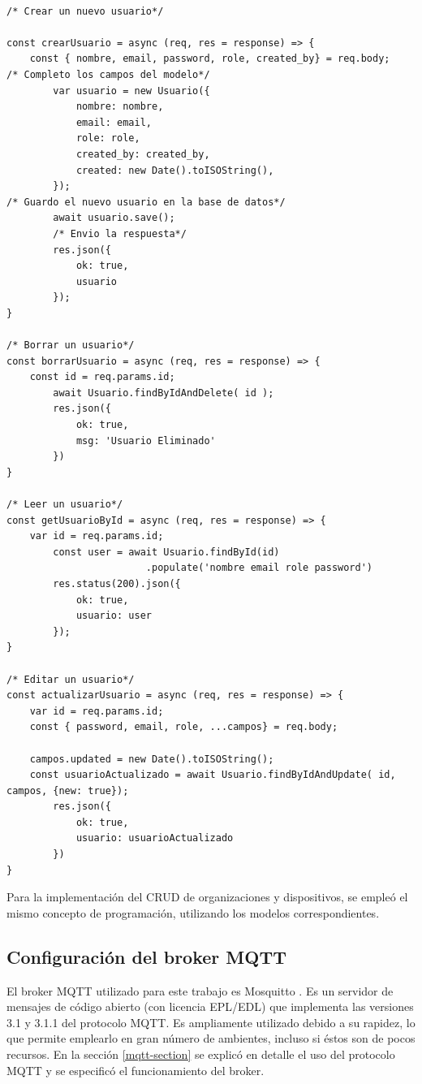 \begin{lstlisting}[label=cod:crud-usuario,caption=Implementación CRUD para usuarios que se registran.] 

/* Crear un nuevo usuario*/

const crearUsuario = async (req, res = response) => {
    const { nombre, email, password, role, created_by} = req.body;  
/* Completo los campos del modelo*/
        var usuario = new Usuario({
            nombre: nombre,
            email: email,
            role: role,
            created_by: created_by,
            created: new Date().toISOString(),      
        });
/* Guardo el nuevo usuario en la base de datos*/
        await usuario.save();
        /* Envio la respuesta*/
        res.json({
            ok: true,
            usuario
        });   
}

/* Borrar un usuario*/
const borrarUsuario = async (req, res = response) => {
    const id = req.params.id;
        await Usuario.findByIdAndDelete( id );
        res.json({
            ok: true,
            msg: 'Usuario Eliminado'
        })
}

/* Leer un usuario*/
const getUsuarioById = async (req, res = response) => {
    var id = req.params.id;
        const user = await Usuario.findById(id)
                        .populate('nombre email role password')
        res.status(200).json({
            ok: true,
            usuario: user
        });
}

/* Editar un usuario*/
const actualizarUsuario = async (req, res = response) => {
    var id = req.params.id;
    const { password, email, role, ...campos} = req.body;

    campos.updated = new Date().toISOString();
    const usuarioActualizado = await Usuario.findByIdAndUpdate( id, campos, {new: true});
        res.json({
            ok: true,
            usuario: usuarioActualizado
        })
}

\end{lstlisting}


Para la implementación del CRUD de organizaciones y dispositivos, se empleó el mismo concepto de programación, utilizando los modelos correspondientes. 


\subsection{Configuración del broker MQTT}
\label{mqtt-sec}

El broker MQTT utilizado para este trabajo es Mosquitto \citep{WEBSITE:39}. Es un servidor de mensajes de código abierto (con licencia EPL/EDL) que implementa las versiones 3.1 y 3.1.1 del protocolo MQTT. Es ampliamente utilizado debido a su rapidez, lo que permite emplearlo en gran número de ambientes, incluso si éstos son de pocos recursos. En la sección \ref{mqtt-section} se explicó en detalle el uso del protocolo MQTT y se especificó el funcionamiento del broker. 


